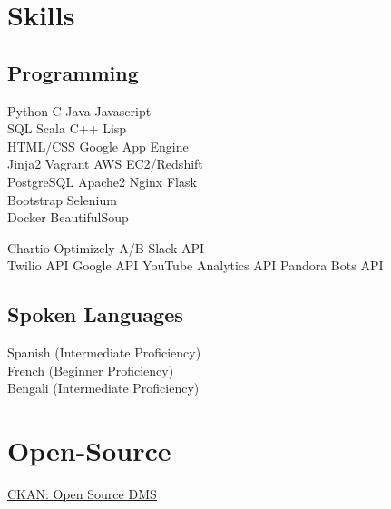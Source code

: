 \documentclass[]{deedy-resume-openfont}
\begin{document}
\begin{minipage}[t]{0.31\textwidth}

\section{Skills}
\subsection{Programming}

Python \textbullet{}  C   \textbullet{} Java \textbullet{} Javascript 
\\[1\baselineskip]

SQL\textbullet{} Scala \textbullet{}  C++  \textbullet{} Lisp
\\[1\baselineskip]

HTML/CSS \textbullet{} Google App Engine \\
\textbullet{}  Jinja2  \textbullet{}  Vagrant \textbullet{} AWS EC2/Redshift\\
\textbullet{} PostgreSQL \textbullet{} Apache2 \textbullet{} Nginx \textbullet{} Flask
\\[1\baselineskip]

Bootstrap \textbullet{}  Selenium \\
\textbullet{} Docker \textbullet{} BeautifulSoup
\sectionsep

Chartio \textbullet{}  Optimizely A/B \textbullet{}  Slack API \\
\textbullet{}  Twilio API \textbullet{}  Google API \textbullet{} YouTube Analytics API \textbullet{} Pandora Bots API
\sectionsep

\subsection{Spoken Languages}
Spanish (Intermediate Proficiency) \\
French (Beginner Proficiency)\\
Bengali (Intermediate Proficiency)
\\[1\baselineskip]

\section{Open-Source}
\textbullet{} \color{cyan}\underline{\color{cyan}\href{https://github.com/ckan/ckan}{\color{cyan}CKAN: Open Source DMS}}

%
%

\end{minipage} 
\end{document}
